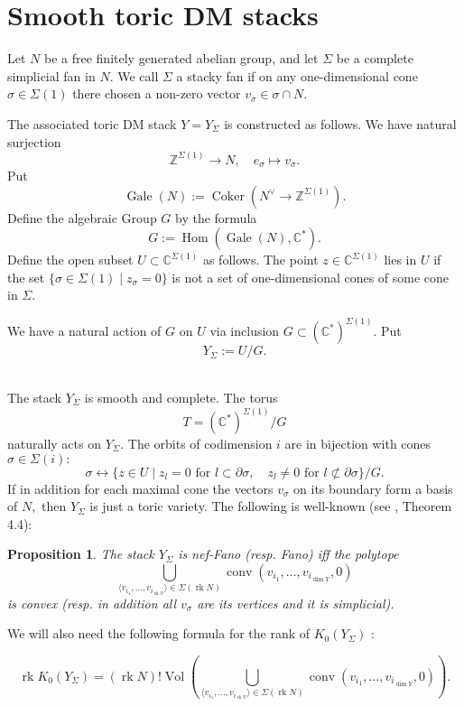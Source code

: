 \documentclass[11pt,leqno]{amsart}
\newtheorem{prop}[theo]{Proposition}
\numberwithin{equation}{section}
\def\C{\mathbb{C}}
\def\Z{\mathbb{Z}}
\def\Hom{\operatorname{Hom}}
\newcommand{\Vol}{\operatorname{Vol}}
\newcommand{\coker}{\operatorname{Coker}}
\newcommand{\rk}{\operatorname{rk}}
\newcommand{\conv}{\operatorname{conv}}
\newcommand{\Gale}{\operatorname{Gale}}
\begin{document}
\section{Smooth toric DM stacks}
\label{DM_stacks}

Let $N$ be a free finitely generated abelian group, and let $\Sigma$ be a complete simplicial fan in $N.$
We call $\Sigma$ a stacky fan if on any one-dimensional cone $\sigma\in\Sigma(1)$ there chosen a non-zero vector $v_{\sigma}\in\sigma\cap N.$

The associated toric DM stack $Y=Y_{\Sigma}$ is constructed as follows. We have natural
surjection
$$\Z^{\Sigma(1)}\to N,\quad e_{\sigma}\mapsto v_{\sigma}.$$
Put
$$\Gale(N):=\coker(N^{\vee}\to \Z^{\Sigma(1)}).$$
Define the algebraic Group $G$ by the formula
$$G:=\Hom(\Gale(N),\C^*).$$
Define the open subset $U\subset \C^{\Sigma(1)}$ as follows. The point $z\in\C^{\Sigma(1)}$ lies in $U$ if the set $\{\sigma\in\Sigma(1)\mid z_{\sigma}=0\}$
is not a set of one-dimensional cones of some cone in $\Sigma.$

We have a natural action of $G$ on $U$ via inclusion $G\subset (\C^*)^{\Sigma(1)}.$ Put
$$Y_{\Sigma}:=U/G.$$\

The stack $Y_{\Sigma}$ is smooth and complete. The torus
$$T=(\C^*)^{\Sigma(1)}/G$$
naturally acts on $Y_{\Sigma}.$ The orbits of codimension $i$ are in bijection with cones $\sigma\in\Sigma(i):$
$$\sigma\leftrightarrow\{z\in U\mid z_l=0\text{ for }l\subset\partial\sigma,\quad z_l\ne 0\text{ for }l\not\subset\partial\sigma\}/G.$$
If in addition for each maximal cone the vectors $v_{\sigma}$ on its boundary form a basis of $N,$
then $Y_{\Sigma}$ is just a toric variety. The following is well-known (see \cite{FLTZ}, Theorem 4.4):

\begin{prop}\label{Fano-cond}The stack $Y_{\Sigma}$ is nef-Fano (resp. Fano) iff the polytope
$$\bigcup\limits_{\langle v_{i_1},\dots,v_{i_{\rk N}}\rangle\in\Sigma(\rk N)}
\conv(v_{i_1},\dots,
v_{i_{\dim Y}},0)$$
is convex (resp. in addition all $v_{\sigma}$ are its vertices and it is simplicial).
\end{prop}

We will also need the following formula for the rank of $K_0(Y_{\Sigma})$ \cite{BHo}:

\begin{equation}\label{K_0_general}\rk K_0(Y_{\Sigma})=(\rk N)!\Vol(\bigcup\limits_{\langle v_{i_1},\dots,v_{i_{\rk N}}\rangle\in\Sigma(\rk N)}
\conv(v_{i_1},\dots,
v_{i_{\dim Y}},0)).\end{equation}
\end{document}
